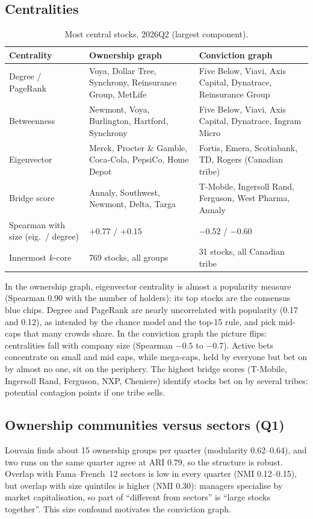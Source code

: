 \documentclass[10pt,a4paper]{article}
\begin{document}
\subsection{Centralities}
\begin{table}[H]
\centering\footnotesize\setlength{\tabcolsep}{3pt}
\caption{Most central stocks, 2026Q2 (largest component).}
\label{tab:central}
\begin{tabularx}{\linewidth}{@{}p{2.4cm}YY@{}}
\toprule
Centrality & Ownership graph & Conviction graph \\
\midrule
Degree / PageRank & Voya, Dollar Tree, Synchrony, Reinsurance Group, MetLife & Five Below, Viavi, Axis Capital, Dynatrace, Reinsurance Group \\
Betweenness & Newmont, Voya, Burlington, Hartford, Synchrony & Five Below, Viavi, Axis Capital, Dynatrace, Ingram Micro \\
Eigenvector & Merck, Procter \& Gamble, Coca-Cola, PepsiCo, Home Depot & Fortis, Emera, Scotiabank, TD, Rogers (Canadian tribe) \\
Bridge score & Annaly, Southwest, Newmont, Delta, Targa & T-Mobile, Ingersoll Rand, Ferguson, West Pharma, Annaly \\
Spearman with size (eig.\ / degree) & $+0.77$ / $+0.15$ & $-0.52$ / $-0.60$ \\
Innermost $k$-core & 769 stocks, all groups & 31 stocks, all Canadian tribe \\
\bottomrule
\end{tabularx}
\end{table}
In the ownership graph, eigenvector centrality is almost a popularity measure (Spearman 0.90 with the number of holders): its top stocks are the consensus blue chips. Degree and PageRank are nearly uncorrelated with popularity (0.17 and 0.12), as intended by the chance model and the top-15 rule, and pick mid-caps that many crowds share. In the conviction graph the picture flips: centralities fall with company size (Spearman $-0.5$ to $-0.7$). Active bets concentrate on small and mid caps, while mega-caps, held by everyone but bet on by almost no one, sit on the periphery. The highest bridge scores (T-Mobile, Ingersoll Rand, Ferguson, NXP, Cheniere) identify stocks bet on by several tribes: potential contagion points if one tribe sells.

\subsection{Ownership communities versus sectors (Q1)}
Louvain finds about 15 ownership groups per quarter (modularity 0.62--0.64), and two runs on the same quarter agree at ARI 0.79, so the structure is robust. Overlap with Fama--French~12 sectors is low in every quarter (NMI 0.12--0.15), but overlap with size quintiles is higher (NMI 0.30): managers specialise by market capitalisation, so part of ``different from sectors'' is ``large stocks together''. This size confound motivates the conviction graph.
\end{document}
